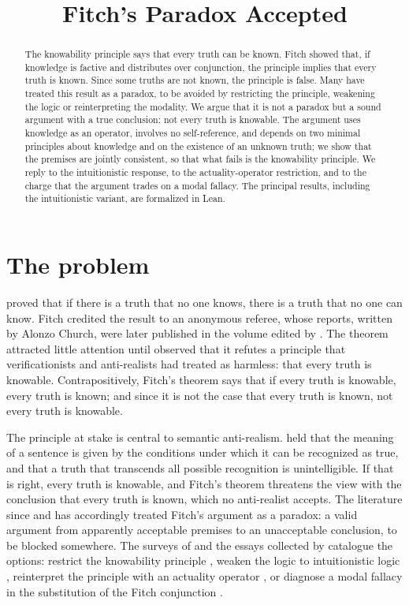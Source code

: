 \documentclass{situationist-preprint}
\title{Fitch's Paradox Accepted}
\begin{document}
\maketitle

\begin{abstract}
The knowability principle says that every truth can be known. Fitch showed that, if knowledge is factive and distributes over conjunction, the principle implies that every truth is known. Since some truths are not known, the principle is false. Many have treated this result as a paradox, to be avoided by restricting the principle, weakening the logic or reinterpreting the modality. We argue that it is not a paradox but a sound argument with a true conclusion: not every truth is knowable. The argument uses knowledge as an operator, involves no self-reference, and depends on two minimal principles about knowledge and on the existence of an unknown truth; we show that the premises are jointly consistent, so that what fails is the knowability principle. We reply to the intuitionistic response, to the actuality-operator restriction, and to the charge that the argument trades on a modal fallacy. The principal results, including the intuitionistic variant, are formalized in Lean.
\end{abstract}

\section{The problem}

\citet[Theorem~5]{Fitch1963} proved that if there is a truth that no one knows, there is a truth that no one can know. Fitch credited the result to an anonymous referee, whose reports, written by Alonzo Church, were later published in the volume edited by \citet{Salerno2009}. The theorem attracted little attention until \citet{HartMcGinn1976} observed that it refutes a principle that verificationists and anti-realists had treated as harmless: that every truth is knowable. Contrapositively, Fitch's theorem says that if every truth is knowable, every truth is known; and since it is not the case that every truth is known, not every truth is knowable.

The principle at stake is central to semantic anti-realism. \citet{Dummett1976} held that the meaning of a sentence is given by the conditions under which it can be recognized as true, and that a truth that transcends all possible recognition is unintelligible. If that is right, every truth is knowable, and Fitch's theorem threatens the view with the conclusion that every truth is known, which no anti-realist accepts. The literature since \citet{Williamson1982} and \citet{Edgington1985} has accordingly treated Fitch's argument as a paradox: a valid argument from apparently acceptable premises to an unacceptable conclusion, to be blocked somewhere. The surveys of \citet{Kvanvig2006} and the essays collected by \citet{Salerno2009} catalogue the options: restrict the knowability principle \citep{Tennant1997,Dummett2001}, weaken the logic to intuitionistic logic \citep{Williamson1982}, reinterpret the principle with an actuality operator \citep{Edgington1985}, or diagnose a modal fallacy in the substitution of the Fitch conjunction \citep{Kvanvig2006}.
\end{document}
